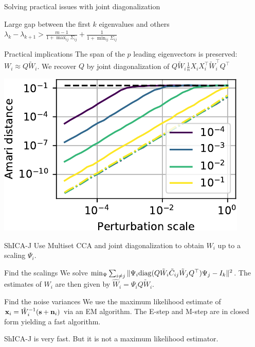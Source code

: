 \documentclass[bigger]{beamer}
\begin{document}
\begin{frame}{Solving practical issues with joint diagonalization}
  \begin{block}{Large gap between the first $k$ eigenvalues and others}
    $\lambda_k - \lambda_{k+1} > \frac{m-1}{1 + \max_{ij} \Sigma_{ij}} +
    \frac1{1 + \min_{ij} \Sigma_{ij}}$
  \end{block}
  \begin{block}{Practical implications}
    The span of the $p$ leading eigenvectors is preserved:
    $W_i \approx Q \tilde{W}_i$.
    We recover $Q$ by joint diagonalization of $Q \tilde{W}_i \frac1{n}X_i X_i^{\top} \tilde{W}_i^{\top}Q^{\top}$
  \end{block}
  \includegraphics[scale=0.8]{figures/multicca_gap_jd.pdf}
\end{frame}

\begin{frame}{ShICA-J}
 Use Multiset CCA and joint diagonalization to obtain $W_i$ up to a
    scaling $\Psi_i$.
  \begin{block}{Find the scalings}
    We solve $\min_{\Psi} \sum_{i \neq j} \|\Psi_i {\rm diag}(Q \tilde{W}_i
    \tilde{C}_{ij} \tilde{W}_j Q^{\top}) \Psi_j - I_k \|^2$.
    The estimates of $W_i$ are then given by $\hat{W}_i = \Psi_i Q \tilde{W}_i$.
  \end{block}

  \begin{block}{Find the noise variances}
    We use the maximum likelihood estimate of $\mathbf{x}_i = \hat{W}_i^{-1}(\mathbf{s} +
    \mathbf{n}_i)$ via an EM algorithm.
    The E-step and M-step are in closed form yielding a fast algorithm.
  \end{block}
  ShICA-J is very fast. But it is not a maximum likelihood estimator.
\end{frame}
\end{document}
